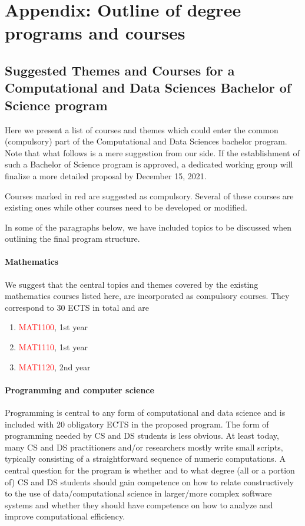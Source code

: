 \documentclass[oneside,final,10pt]{article}
\begin{document}
\section*{Appendix:  Outline of degree programs and courses}

\subsection*{Suggested Themes and Courses for a Computational and Data Sciences  Bachelor of Science program}

Here we present a list of courses and themes which could enter the common (compulsory) part of the Computational and Data Sciences  bachelor program.  Note that what follows is a mere suggestion from our side. If the establishment of such a Bachelor of Science program is approved, a dedicated working group will finalize a more detailed proposal by December 15, 2021.

Courses marked in red are suggested as compulsory.
Several of these courses are existing ones while other courses need to be developed or modified. 

In some of the paragraphs below, we have included topics to be discussed when outlining the final program structure. 

\paragraph{Mathematics}
We suggest that the central topics and themes covered by the existing mathematics courses listed here, are incorporated as compulsory courses. They correspond to 
30 ECTS in total and are
\begin{enumerate}
\color{red}
    \item \textcolor{red}{MAT1100}, 1st year
    \item \textcolor{red}{MAT1110}, 1st year
    \item \textcolor{red}{MAT1120}, 2nd year
\end{enumerate}

\paragraph{Programming and computer science}
Programming is central to any form of computational and data science and is included with 20 obligatory ECTS in the proposed program. The form of programming needed by CS and DS students is less obvious. At least today, many CS and DS practitioners and/or researchers mostly write small scripts, typically consisting of a straightforward sequence of numeric computations. A central question for the program is whether and to what degree (all or a portion of) CS and DS students should gain competence on how to relate constructively to the use of data/computational science in larger/more complex software systems and whether they should have competence on how to analyze and improve computational efficiency. 
\end{document}
